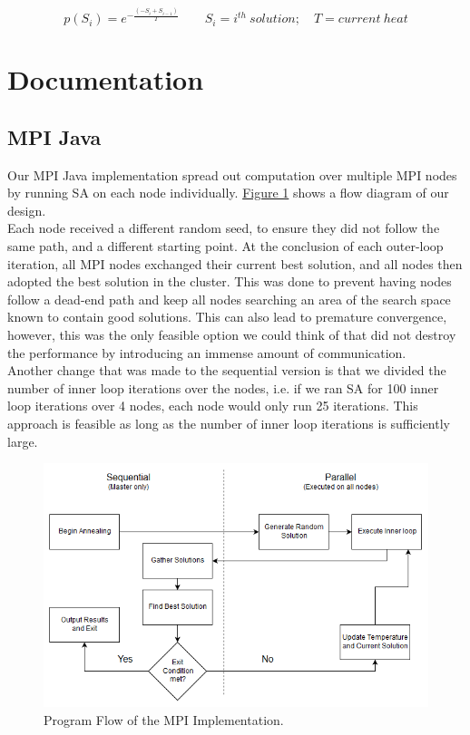 \documentclass{article}
\begin{document}
		\begin{equation}\label{E_AP}
			p(S_i) = e^{-\frac{(-S_{i} + S_{i-1} )}{T}} \qquad S_i = i^{th}~solution; \quad T = current~heat
		\end{equation}
	
	\section{Documentation} \label{DOCUMENTATION}
		\subsection{MPI Java} \label{D_MPI}
			Our MPI Java implementation spread out computation over multiple MPI nodes by running SA on each node individually. \hyperref[F1]{Figure 1} shows a flow diagram of our design. \\
			
			Each node received a different random seed, to ensure they did not follow the same path, and a different starting point. At the conclusion of each outer-loop iteration, all MPI nodes exchanged their current best solution, and all nodes then adopted the best solution in the cluster. This was done to prevent having nodes follow a dead-end path and keep all nodes searching an area of the search space known to contain good solutions. This can also lead to premature convergence, however, this was the only feasible option we could think of that did not destroy the performance by introducing an immense amount of communication. \\
			
			Another change that was made to the sequential version is that we divided the number of inner loop iterations over the nodes, i.e. if we ran SA for 100 inner loop iterations over 4 nodes, each node would only run 25 iterations. This approach is feasible as long as the number of inner loop iterations is sufficiently large.
		
			\begin{figure}\label{F1}
				\caption{Program Flow of the MPI Implementation.}
				\centering
				\includegraphics[scale=0.65]{mpi_flow.png}
			\end{figure}
		
\end{document}

